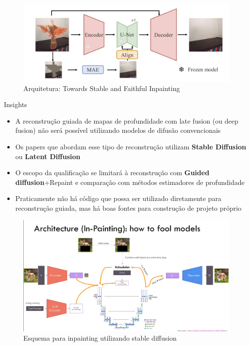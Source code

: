 \documentclass[aspectratio=169]{beamer}
\begin{document}
\begin{frame}
\begin{figure}
    \centering
    \includegraphics[scale=.3]{figs/faithfulinpainting.png}
    \caption{Arquitetura: Towards Stable and Faithful Inpainting}
\end{figure}   
\end{frame}


\begin{frame}{Insights}
    \begin{example}
        \begin{itemize}
            \item A reconstrução guiada de mapas de profundidade com late fusion (ou deep fusion) não será possível utilizando modelos de difusão convencionais
            \item Os papers que abordam esse tipo de reconstrução utilizam \textbf{Stable Diffusion} ou \textbf{Latent Diffusion}
            \item O escopo da qualificação se limitará à reconstrução com \textbf{Guided diffusion}+Repaint e comparação com métodos estimadores de profundidade
            \item Praticamente não há código que possa ser utilizado diretamente para reconstrução guiada, mas há boas fontes para construção de projeto próprio
        \end{itemize}
    \end{example}

\end{frame}


\begin{frame}

    \begin{figure}
        \centering
        \includegraphics[width=\textwidth]{figs/stableinpainting.png}
        \caption{Esquema para inpainting utilizando stable diffusion}
    \end{figure}   
\end{frame}
\end{document}
